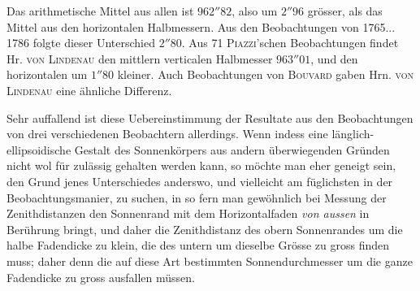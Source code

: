 Das arithmetische Mittel aus allen ist $962''82$, also um $2''96$ grösser, als das Mittel aus den horizontalen Halbmessern. Aus den Beobachtungen von 1765... 1786 folgte dieser Unterschied $2''80$. Aus 71 \textsc{Piazzi}'schen Beobachtungen findet Hr. \textsc{von Lindenau} den mittlern verticalen Halbmesser $963''01$, und den horizontalen um $1''80$ kleiner. Auch Beobachtungen von \textsc{Bouvard} gaben Hrn. \textsc{von Lindenau} eine ähnliche Differenz.

Sehr auffallend ist diese Uebereinstimmung der Resultate aus den Beobachtungen von drei verschiedenen Beobachtern allerdings. Wenn indess eine länglich-ellipsoidische Gestalt des Sonnenkörpers aus andern überwiegenden Gründen nicht wol für zulässig gehalten werden kann, so möchte man eher geneigt sein, den Grund jenes Unterschiedes anderswo, und vielleicht am füglichsten in der Beobachtungsmanier, zu suchen, in so fern man gewöhnlich bei Messung der Zenithdistanzen den Sonnenrand mit dem Horizontalfaden \emph{von aussen} in Berührung bringt, und daher die Zenithdistanz des obern Sonnenrandes um die halbe Fadendicke zu klein, die des untern um dieselbe Grösse zu gross finden muss; daher denn die auf diese Art bestimmten Sonnendurchmesser um die ganze Fadendicke zu gross ausfallen müssen.
\clearpage
\endgroup

